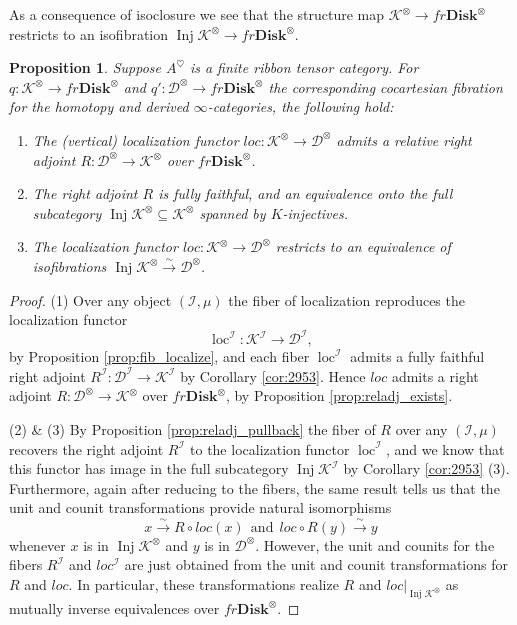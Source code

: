 \documentclass[reqno]{amsart}
\newtheorem{proposition}[lemma]{Proposition}
\theoremstyle{definition}
\newcommand{\mcl}[1]{\mathcal{#1}}
\newcommand{\msc}[1]{\mathscr{#1}}
\newcommand{\opn}[1]{\operatorname{#1}}
\newcommand{\ot}{\otimes}
\newcommand{\Disk}{\mathbf{Disk}}
\renewcommand{\1}{\mathbf{1}}
\begin{document}
As a consequence of isoclosure we see that the structure map $\msc{K}^{\ot}\to fr\Disk^{\ot}$ restricts to an isofibration $\opn{Inj}\msc{K}^{\ot}\to fr\Disk^{\ot}$.

\begin{proposition}\label{prop:3009}
Suppose $A^{\heartsuit}$ is a finite ribbon tensor category.  For $q:\msc{K}^{\ot}\to fr\Disk^{\ot}$ and $q':\msc{D}^{\ot}\to fr\Disk^{\ot}$ the corresponding cocartesian fibration for the homotopy and derived $\infty$-categories, the following hold:
\begin{enumerate}
\item The (vertical) localization functor $loc:\msc{K}^{\ot}\to \msc{D}^{\ot}$ admits a relative right adjoint $R:\msc{D}^{\ot}\to \msc{K}^{\ot}$ over $fr\Disk^{\ot}$.\vspace{1mm}
\item The right adjoint $R$ is fully faithful, and an equivalence onto the full subcategory $\opn{Inj}\msc{K}^{\ot}\subseteq \msc{K}^{\ot}$ spanned by $K$-injectives.\vspace{1mm}
\item The localization functor $loc:\msc{K}^{\ot}\to \msc{D}^{\ot}$ restricts to an equivalence of isofibrations $\opn{Inj}\msc{K}^{\ot}\overset{\sim}\to \msc{D}^{\ot}$.
\end{enumerate}
\end{proposition}

\begin{proof}
(1) Over any object $(\mcl{I},\mu)$ the fiber of localization reproduces the localization functor
\[
\opn{loc}^{\mcl{I}}:\msc{K}^{\mcl{I}}\to \msc{D}^{\mcl{I}},
\]
by Proposition \ref{prop:fib_localize}, and each fiber $\opn{loc}^{\mcl{I}}$ admits a fully faithful right adjoint $R^{\mcl{I}}:\msc{D}^{\mcl{I}}\to \msc{K}^{\mcl{I}}$ by Corollary \ref{cor:2953}.  Hence $loc$ admits a right adjoint $R:\msc{D}^{\ot}\to \msc{K}^{\ot}$ over $fr\Disk^{\ot}$, by Proposition \ref{prop:reladj_exists}.
\par

(2) \& (3) By Proposition \ref{prop:reladj_pullback} the fiber of $R$ over any $(\mcl{I},\mu)$ recovers the right adjoint $R^{\mcl{I}}$ to the localization functor $\opn{loc}^{\mcl{I}}$, and we know that this functor has image in the full subcategory $\opn{Inj}\msc{K}^{\mcl{I}}$ by Corollary \ref{cor:2953} (3).  Furthermore, again after reducing to the fibers, the same result tells us that the unit and counit transformations provide natural isomorphisms
\[
x\overset{\sim}\to R\circ loc(x)\ \ \text{and}\ \ loc\circ R(y)\overset{\sim}\to y
\]
whenever $x$ is in $\opn{Inj}\msc{K}^{\ot}$ and $y$ is in $\msc{D}^{\ot}$.  However, the unit and counits for the fibers $R^{\mcl{I}}$ and $loc^{\mcl{I}}$ are just obtained from the unit and counit transformations for $R$ and $loc$.  In particular, these transformations realize $R$ and $loc|_{\opn{Inj}\msc{K}^{\ot}}$ as mutually inverse equivalences over $fr\Disk^{\ot}$.
\end{proof}
\end{document}
